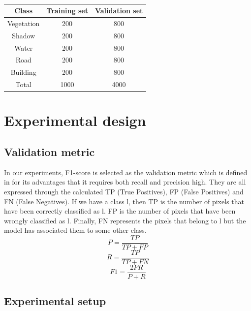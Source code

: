 \documentclass{isprs} %
\begin{document}
\begin{table}[ht!]
	\begin{center}
		\begin{tabular}{c|c|c}
		\toprule
		Class & Training set & Validation set  \\
		\midrule
		Vegetation           & 200 & 800\\
		Shadow               & 200 & 800\\
		Water                & 200 & 800\\
		Road                 & 200 & 800\\
		Building             & 200 & 800\\
		\midrule
		Total                & 1000 & 4000\\
		\bottomrule
		\end{tabular}
	\caption{}
	\end{center}
\end{table}

\section{Experimental design}\label{sec:Experimental design}

\subsection{Validation metric}

In our experiments, F1-score is selected as the validation metric which is defined in for its advantages that it requires both recall and precision high. They are all expressed through the calculated TP (True Positives), FP (False Positives) and FN (False Negatives). If we have a class l, then TP is the number of pixels that have been correctly classified as l. FP is the number of pixels that have been wrongly classified as l. Finally, FN represents the pixels that belong to l but the model has associated them to some other class. 
\begin{equation}
	P=\frac{TP}{TP+FP}
\end{equation}
\begin{equation}
	R=\frac{TP}{TP+FN}
\end{equation}
\begin{equation}
	F1=\frac{2PR}{P+R}
\end{equation}

\subsection{Experimental setup}
\end{document}
